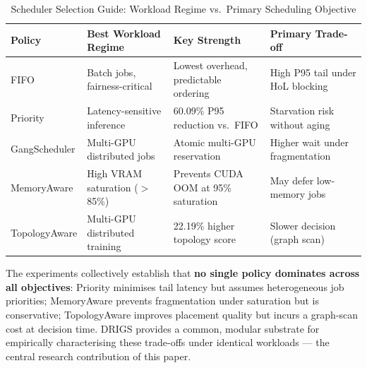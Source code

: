 \begin{table}[htbp]
\centering
\caption{Scheduler Selection Guide: Workload Regime vs.\ Primary Scheduling Objective}
\label{tab:scheduler_guide}
\begin{tabular}{llll}
\toprule
\textbf{Policy} & \textbf{Best Workload Regime} & \textbf{Key Strength} & \textbf{Primary Trade-off} \\
\midrule
FIFO            & Batch jobs, fairness-critical  & Lowest overhead, predictable ordering   & High P95 tail under HoL blocking \\
Priority        & Latency-sensitive inference    & 60.09\% P95 reduction vs.\ FIFO         & Starvation risk without aging \\
GangScheduler   & Multi-GPU distributed jobs      & Atomic multi-GPU reservation            & Higher wait under fragmentation \\
MemoryAware     & High VRAM saturation ($>$85\%) & Prevents CUDA OOM at 95\% saturation    & May defer low-memory jobs \\
TopologyAware   & Multi-GPU distributed training & 22.19\% higher topology score           & Slower decision (graph scan) \\
\bottomrule
\end{tabular}
\end{table}

The experiments collectively establish that \textbf{no single policy dominates across all objectives}: Priority minimises tail latency but assumes heterogeneous job priorities; MemoryAware prevents fragmentation under saturation but is conservative; TopologyAware improves placement quality but incurs a graph-scan cost at decision time. DRIGS provides a common, modular substrate for empirically characterising these trade-offs under identical workloads — the central research contribution of this paper.
